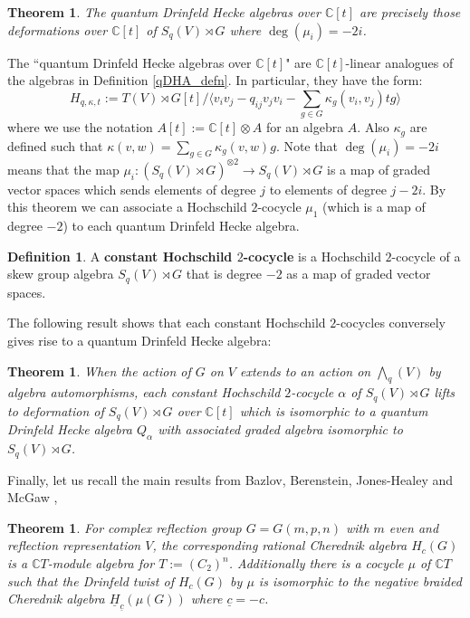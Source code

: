 \documentclass[10pt]{article}
\newcommand{\nt}{\noindent}
\newcommand{\Cc }{\mathbb{C}}
\newcommand{\rt}{\xrightarrow{}}
\newcommand{\define}[1]{\textbf{#1}\index{#1}}
\newtheorem{theorem}[lemma]{Theorem}
\theoremstyle{definition}
\newtheorem{definition}[lemma]{Definition}
\begin{document}
\begin{theorem}\label{thm_2.2}\cite[Theorem 2.2]{2011arXiv11115243N} The quantum Drinfeld Hecke algebras over $\Cc [t]$ are precisely those deformations over $\Cc [t]$ of $S_q(V)\rtimes G$ where $\deg(\mu_i)=-2i$.
\end{theorem}

\nt The ``quantum Drinfeld Hecke algebras over $\Cc  [t]$" are $\Cc [t]$-linear analogues of the algebras in Definition \ref{qDHA_defn}. In particular, they have the form:
\begin{equation}\label{qdha_over_ct}
  H_{q,\kappa,t}:=T(V)\rtimes G[t]/\langle v_i v_j-q_{ij}v_j v_i - \sum_{g\in G} \kappa_g (v_i,v_j)tg\rangle
\end{equation}
where we use the notation $A[t]:=\Cc[t]\otimes A$ for an algebra $A$. Also $\kappa_g$ are defined such that $\kappa(v,w)=\sum_{g\in G}\kappa_g(v,w)g$. Note that $\deg(\mu_i)=-2i$ means that the map $\mu_i:(S_q(V)\rtimes G)^{\otimes 2}\rt S_q(V)\rtimes G$ is a map of graded vector spaces which sends elements of degree $j$ to elements of degree $j-2i$. By this theorem we can associate a Hochschild $2$-cocycle $\mu_1$ (which is a map of degree $-2$) to each quantum Drinfeld Hecke algebra.

\begin{definition}\label{constant} \cite{2011arXiv11115243N}
A \define{constant Hochschild $2$-cocycle} is a Hochschild $2$-cocycle of a skew group algebra $S_q(V)\rtimes G$ that is degree $-2$ as a map of graded vector spaces.
\end{definition}

\nt The following result shows that each constant Hochschild $2$-cocycles conversely gives rise to a quantum Drinfeld Hecke algebra:
\begin{theorem}\cite[Theorem 4.4,4.6]{2011arXiv11115243N}\label{quantum_dh_alg} When the action of $G$ on $V$ extends to an action on $\bigwedge_q(V)$ by algebra automorphisms, each constant Hochschild $2$-cocycle $\alpha$ of $S_q(V)\rtimes G$ lifts to deformation of $S_q(V)\rtimes G$ over $\Cc [t]$ which is isomorphic to a quantum Drinfeld Hecke algebra $Q_\alpha$ with associated graded algebra isomorphic to $S_q(V)\rtimes G$.
\end{theorem}

\nt Finally, let us recall the main results from Bazlov, Berenstein, Jones-Healey and McGaw \cite{twistsrcas},

\begin{theorem}\label{our_theorem}\cite[Proposition 5.1, Theorem 5.2]{twistsrcas} For complex reflection group $G=G(m,p,n)$ with $m$ even and reflection representation $V$, the corresponding rational Cherednik algebra $H_{c}(G)$ is a $\Cc  T$-module algebra for $T:=(C_2)^n$. Additionally there is a cocycle $\mu$ of $\Cc  T$ such that the Drinfeld twist of $H_c(G)$ by $\mu$ is isomorphic to the negative braided Cherednik algebra $\underline{H}_{\underline{c}}(\mu(G))$ where $\underline{c}=-c$.
\end{theorem}
\end{document}
